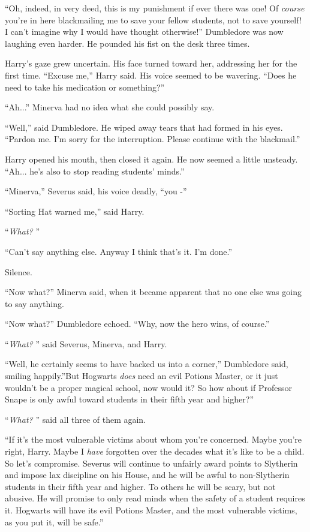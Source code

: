 ``Oh, indeed, in very deed, this is my punishment if ever there was one!
Of \emph{course} you're in here blackmailing me to save your fellow
students, not to save yourself! I can't imagine why I would have thought
otherwise!'' Dumbledore was now laughing even harder. He pounded his
fist on the desk three times.

Harry's gaze grew uncertain. His face turned toward her, addressing her
for the first time. ``Excuse me,'' Harry said. His voice seemed to be
wavering. ``Does he need to take his medication or something?''

``Ah...'' Minerva had no idea what she could possibly say.

``Well,'' said Dumbledore. He wiped away tears that had formed in his
eyes. ``Pardon me. I'm sorry for the interruption. Please continue with
the blackmail.''

Harry opened his mouth, then closed it again. He now seemed a little
unsteady. ``Ah... he's also to stop reading students' minds.''

``Minerva,'' Severus said, his voice deadly, ``you -''

``Sorting Hat warned me,'' said Harry.

``\emph{What?} ''

``Can't say anything else. Anyway I think that's it. I'm done.''

Silence.

``Now what?'' Minerva said, when it became apparent that no one else was
going to say anything.

``Now what?'' Dumbledore echoed. ``Why, now the hero wins, of course.''

``\emph{What?} '' said Severus, Minerva, and Harry.

``Well, he certainly seems to have backed us into a corner,'' Dumbledore
said, smiling happily.''But Hogwarts \emph{does} need an evil Potions
Master, or it just wouldn't be a proper magical school, now would it? So
how about if Professor Snape is only awful toward students in their
fifth year and higher?''

``\emph{What?} '' said all three of them again.

``If it's the most vulnerable victims about whom you're concerned. Maybe
you're right, Harry. Maybe I \emph{have} forgotten over the decades what
it's like to be a child. So let's compromise. Severus will continue to
unfairly award points to Slytherin and impose lax discipline on his
House, and he will be awful to non-Slytherin students in their fifth
year and higher. To others he will be scary, but not abusive. He will
promise to only read minds when the safety of a student requires it.
Hogwarts will have its evil Potions Master, and the most vulnerable
victims, as you put it, will be safe.''

